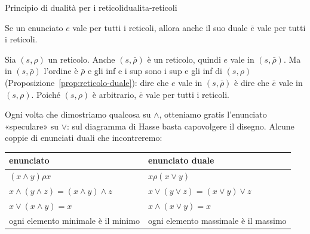 
\begin{concetto}
\begin{Teorema}{Principio di dualità per i reticoli}{dualita-reticoli}
    \begin{prerequisiti}
    \end{prerequisiti}
    Se un enunciato $e$ vale per tutti i reticoli, allora anche il suo duale $\bar{e}$ vale per tutti i reticoli.
\end{Teorema}
\begin{dimostrazione}
    Sia $(s, \rho)$ un reticolo. Anche $(s, \bar{\rho})$ è un reticolo, quindi $e$ vale in $(s, \bar{\rho})$. Ma in $(s, \bar{\rho})$ l'ordine è $\bar{\rho}$ e gli inf e i sup
    sono i sup e gli inf di $(s, \rho)$ (Proposizione~\ref{prop:reticolo-duale}): dire che $e$ vale in $(s, \bar{\rho})$ è dire che $\bar{e}$ vale in $(s, \rho)$. Poiché
    $(s, \rho)$ è arbitrario, $\bar{e}$ vale per tutti i reticoli.
\end{dimostrazione}
\end{concetto}

\begin{spiegazione}
    Ogni volta che dimostriamo qualcosa su $\wedge$, otteniamo gratis l'enunciato «speculare» su $\vee$: sul diagramma di Hasse basta
    capovolgere il disegno. Alcune coppie di enunciati duali che incontreremo:
    \begin{center}
    \renewcommand{\arraystretch}{1.25}
    \begin{tabular}{l|l}
        \textbf{enunciato} & \textbf{enunciato duale} \\ \hline
        $(x \wedge y) \rho x$ & $x \rho (x \vee y)$ \\
        $x \wedge (y \wedge z) = (x \wedge y) \wedge z$ & $x \vee (y \vee z) = (x \vee y) \vee z$ \\
        $x \vee (x \wedge y) = x$ & $x \wedge (x \vee y) = x$ \\
        ogni elemento minimale è il minimo & ogni elemento massimale è il massimo \\
    \end{tabular}
    \end{center}
\end{spiegazione}

